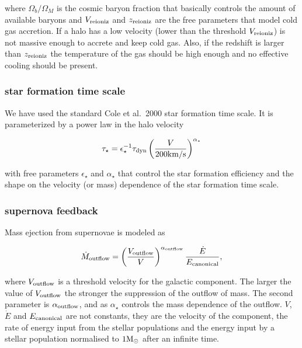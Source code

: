 \documentclass[useAMS,usenatbib]{mn2e}
\newcommand{\etal}{et al.~}
\begin{document}
where $\Omega_b/\Omega_M$ is the cosmic baryon fraction that basically
controls the amount of available baryons and $V_{\rm reioniz}$ and
$z_{\rm reioniz}$ are the free parameters that model cold gas
accretion. If a halo has a low velocity (lower than the threshold
$V_{\rm reioniz}$) is not massive enough to accrete and keep cold
gas. Also, if the redshift is larger than $z_{\rm reioniz}$ the
temperature of the gas should be high enough and no effective cooling
should be present.


\subsubsection{star formation time scale}

We have used the standard Cole \etal 2000 star formation time
scale. It is parameterized by a power law in the halo velocity

\begin{equation}
 \tau_{\star} = \epsilon^{-1}_{\star}\tau_{{\rm dyn}}\left(
 \frac{V}{200{\rm km/s}}\right)^{\alpha_\star}
\end{equation}

with free parameters $\epsilon_{\star}$ and $\alpha_\star$ that control
the star formation efficiency and the shape on the velocity (or mass)
dependence of the star formation time scale.

\subsubsection{supernova feedback}

Mass ejection from supernovae is modeled as

\begin{equation}
 \dot{M}_{\rm outflow}=\left( \frac{V_{\rm outflow}}{V}
 \right)^{\alpha_{\rm outflow}}\frac{\dot{E}}{E_{\rm canonical}}, \label{eq:supernovae}
\end{equation}

where $V_{\rm outflow}$ is a threshold velocity for the galactic
component. The larger the value of $V_{\rm outflow}$ the stronger the
suppression of the outflow of mass. The second parameter is
$\alpha_{\rm outflow}$, and as $\alpha_\star$ controls the mass
dependence of the outflow. $V$, $\dot{E}$ and $E_{\rm canonical}$ are
not constants, they are the velocity of the component, the rate of
energy input from the stellar populations and the energy input by a
stellar population normalised to $1 {\rm M}_{\odot}$ after an infinite time.
\end{document}
